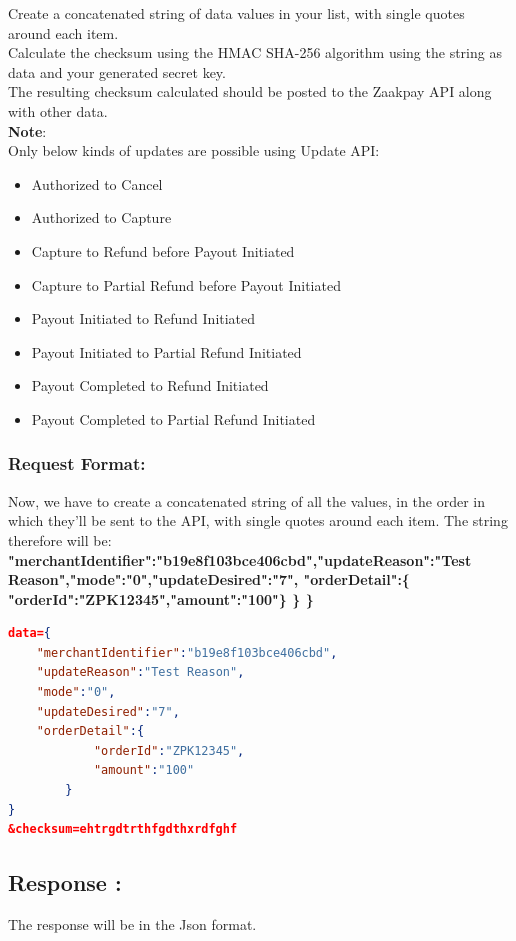 \documentclass{article}
\begin{document}
Create a concatenated string of data values in your list, with single quotes around each item. \\
Calculate the checksum using the HMAC SHA-256 algorithm using the string as data and your generated secret key.\\
The resulting checksum calculated should be posted to the Zaakpay API along with other data.\\



{\bfseries Note}: \\
Only below kinds of updates are possible using Update API:\\
\begin{itemize}
\item Authorized to Cancel
\item Authorized to Capture
\item Capture to Refund before Payout Initiated
\item Capture to Partial Refund before Payout Initiated
\item Payout Initiated to Refund Initiated
\item Payout Initiated to Partial Refund Initiated
\item Payout Completed to Refund Initiated
\item Payout Completed to Partial Refund Initiated
\end{itemize}
\subsubsection{Request Format:}
Now, we have to create a concatenated string of all the values, in the order in which they'll be sent to the API, with single quotes around each item. The string therefore will be: \\
{\bfseries \textquotesingle{}"merchantIdentifier":"b19e8f103bce406cbd","updateReason":"Test Reason","mode":"0","updateDesired":"7",	"orderDetail":\{ "orderId":"ZPK12345","amount":"100"\} \}  \} } \textquotesingle  \\
\begin{lstlisting}[language=json,breaklines=true]
data={
	"merchantIdentifier":"b19e8f103bce406cbd",
	"updateReason":"Test Reason",
	"mode":"0",
	"updateDesired":"7",
	"orderDetail":{
			"orderId":"ZPK12345",
			"amount":"100"
		}
}
&checksum=ehtrgdtrthfgdthxrdfghf
\end{lstlisting}
\newpage
\subsection{Response :}
The response will be in the Json format. 
\end{document}
